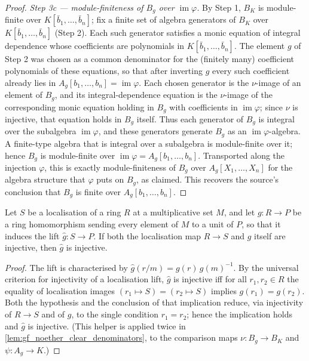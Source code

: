 \begin{proof}
  \emph{Step 3c — module-finiteness of \(B_g\) over \(\operatorname{im}\varphi\).} By Step 1,
  \(B_K\) is module-finite over \(K[\bar b_1, \dots, \bar b_n]\); fix a finite set of algebra
  generators of \(B_K\) over \(K[\bar b_1, \dots, \bar b_n]\) (Step 2). Each such generator
  satisfies a monic equation of integral dependence whose coefficients are polynomials in
  \(K[\bar b_1, \dots, \bar b_n]\). The element \(g\) of Step 2 was chosen as a common
  denominator for the (finitely many) coefficient polynomials of these equations, so that
  after inverting \(g\) every such coefficient already lies in
  \(A_g[b_1, \dots, b_n] = \operatorname{im}\varphi\). Each chosen generator is the
  \(\nu\)-image of an element of \(B_g\), and its integral-dependence equation is the
  \(\nu\)-image of the corresponding monic equation holding in \(B_g\) with coefficients in
  \(\operatorname{im}\varphi\); since \(\nu\) is injective, that equation holds in \(B_g\)
  itself. Thus each generator of \(B_g\) is integral over the subalgebra
  \(\operatorname{im}\varphi\), and these generators generate \(B_g\) as an
  \(\operatorname{im}\varphi\)-algebra. A finite-type algebra that is integral over a
  subalgebra is module-finite over it; hence \(B_g\) is module-finite over
  \(\operatorname{im}\varphi = A_g[b_1, \dots, b_n]\). Transported along the injection
  \(\varphi\), this is exactly module-finiteness of \(B_g\) over \(A_g[X_1, \dots, X_n]\) for
  the algebra structure that \(\varphi\) puts on \(B_g\), as claimed. This recovers the
  source's conclusion that \(B_g\) is finite over \(A_g[b_1, \dots, b_n]\).
\end{proof}

\begin{lemma}
  \label{lem:gf_isLocalization_lift_injective}
  Let \(S\) be a localisation of a ring \(R\) at a multiplicative set \(M\), and let
  \(g : R \to P\) be a ring homomorphism sending every element of \(M\) to a unit of
  \(P\), so that it induces the lift \(\widehat g : S \to P\). If both the localisation
  map \(R \to S\) and \(g\) itself are injective, then \(\widehat g\) is injective.
\end{lemma}
\begin{proof}

\leanok
  The lift is characterised by \(\widehat g(r/m) = g(r)\,g(m)^{-1}\). By the universal
  criterion for injectivity of a localisation lift, \(\widehat g\) is injective iff for
  all \(r_1, r_2 \in R\) the equality of localisation images
  \((r_1 \mapsto S) = (r_2 \mapsto S)\) implies \(g(r_1) = g(r_2)\). Both the hypothesis
  and the conclusion of that implication reduce, via injectivity of \(R \to S\) and of
  \(g\), to the single condition \(r_1 = r_2\); hence the implication holds and
  \(\widehat g\) is injective. (This helper is applied twice in
  \cref{lem:gf_noether_clear_denominators}, to the comparison maps \(\nu : B_g \to B_K\)
  and \(\psi : A_g \to K\).)
\end{proof}

